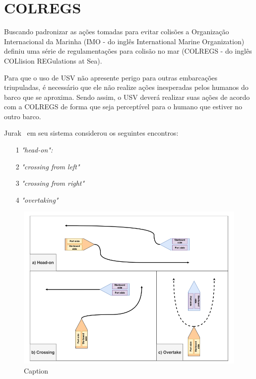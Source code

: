     \section{COLREGS}\label{subchap2:colregs}
        Buscando padronizar as ações tomadas para evitar colisões a Organização Internacional da Marinha (IMO - do inglês International Marine Organization) definiu uma série de regulamentações para colisão no mar (COLREGS - do inglês COLlision REGulations at Sea).~\cite{JURAK2020}
        
        Para que o uso de USV não apresente perigo para outras embarcações triupuladas, é necessário que ele não realize ações inesperadas pelos humanos do barco que se aproxima. Sendo assim, o USV deverá realizar suas ações de acordo com a COLREGS de forma que seja perceptível para o humano que estiver no outro barco.~\cite{KUWATA2014110}
        
        Jurak~\cite{JURAK2020} em seu sistema considerou os seguintes encontros: 
        
        \begin{enumerate}
            \item [1] \textit{"head-on":}
            \item [2] \textit{"crossing from left"}
            \item [3] \textit{"crossing from right"}
            \item [4] \textit{"overtaking"}
        \end{enumerate}
        
        \begin{figure}
            \centering
            \includegraphics{fig/colregs_situations.png}
            \caption{Caption}
            \label{fig:colregs_situations}
        \end{figure}
        
